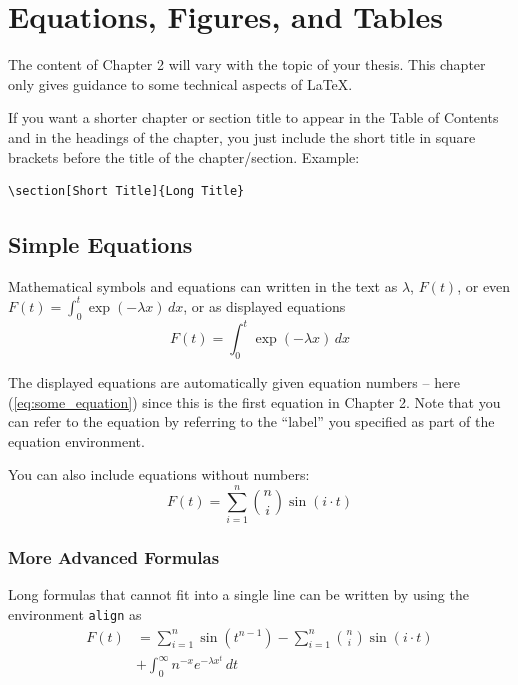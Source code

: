 \documentclass[../Main/thesis.tex]{subfiles}
\begin{document}
\chapter[Equations, etc]{Equations, Figures, and Tables}
\label{ch:equations}
The content of Chapter 2 will vary with the topic of your thesis. 
This chapter only gives guidance to some technical aspects of \LaTeX.
	 
\begin{remark}
If you want a shorter chapter or section title to appear in the Table of Contents and in the headings of the chapter, you just include the short title in square brackets before the title of the chapter/section. 
Example: \begin{verbatim}\section[Short Title]{Long Title}\end{verbatim}
\end{remark}

\section{Simple Equations}
\label{sec:simple_equations}
Mathematical symbols and equations can written in the text as $\lambda$, $F(t)$, or even $F(t)=\int_0^t \exp(-\lambda x)\,dx$, or as displayed equations
\begin{equation}
F(t)=\int_0^t \exp(-\lambda x)\,dx
\label{eq:some_equation}
\end{equation}


The displayed equations are automatically given equation numbers -- here (\ref{eq:some_equation}) since this is the first equation in Chapter 2. 
Note that you can refer to the equation by referring to the ``label'' you specified as part of the equation environment.

You can also include equations without numbers:
\begin{equation*}
F(t)=\sum_{i=1}^n \binom{n}{i}\sin(i\cdot t)
\end{equation*}

\subsection*{More Advanced Formulas}
Long formulas that cannot fit into a single line can be written by using the environment \texttt{align} as
\begin{align}
F(t)&= \sum_{i=1}^n \sin(t^{n-1}) - \sum_{i=1}^n \binom{n}{i}\sin(i\cdot t) \\
      & + \int_0^\infty n^{-x} e^{-\lambda x^t}\,dt
\end{align}
\end{document}
